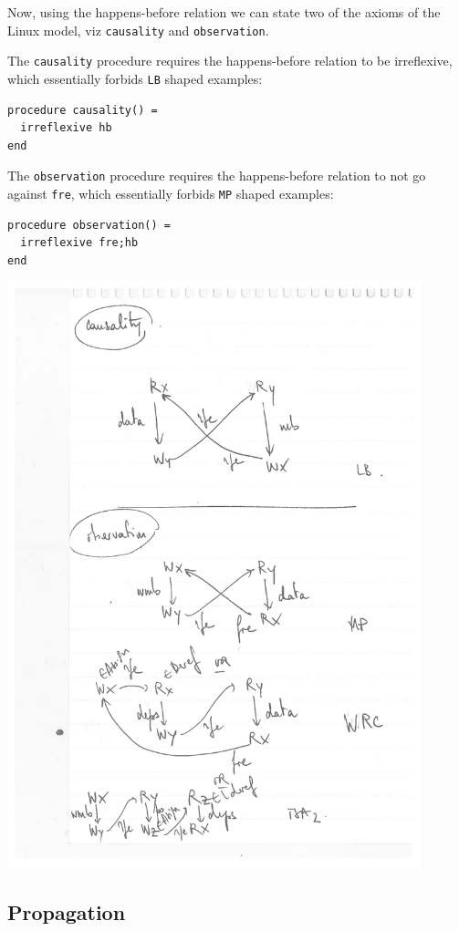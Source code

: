 \documentclass[a4paper]{article}
\begin{document}
\pagebreak

Now, using the happens-before relation we can state two of the axioms of the
Linux model, viz {\tt causality} and {\tt observation}.

The {\tt causality} procedure requires the happens-before relation to be
irreflexive, which essentially forbids {\tt LB}
shaped examples:
\begin{verbatim}
procedure causality() =
  irreflexive hb
end
\end{verbatim}

The {\tt observation} procedure requires the happens-before relation to not go
against {\tt fre}, which essentially forbids {\tt MP} shaped examples:
\begin{verbatim}
procedure observation() =
  irreflexive fre;hb
end
\end{verbatim}

\includegraphics[width=12cm]{c+o}

\pagebreak

\subsection{Propagation}
\end{document}
